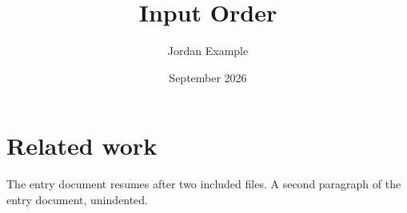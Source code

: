 \documentclass[12pt]{article}
\title{Input Order}
\author{Jordan Example}
\date{September 2026}
\begin{document}
\maketitle




\section{Related work}
The entry document resumes after two included files.
\noindent A second paragraph of the entry document, unindented.


\pagestyle{empty}
\end{document}
